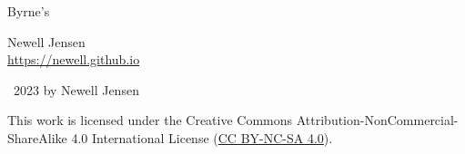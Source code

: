 \documentclass[twoside,11pt]{report}
\begin{document}
\onehalfspacing


%       



\pagecolor{background}
\thispagestyle{empty}

\hfill

\hfill

\hfill

\begin{flushright}
  \LARGE{Byrne's}\\
  \Huge{\color{cred}{E}\color{cblue}{u}\color{cyellow}{c}\color{cred}{l}\color{cblue}{i}\color{cyellow}{d}}
\end{flushright}

\vspace*{\fill}
\newpage

\thispagestyle{empty}

Newell Jensen\\
\url{https://newell.github.io}
\vspace*{\fill}

\large{\textcopyright\ 2023 by Newell Jensen}

\hfill

\hfill

\centerline{\ccbyncsa}

\begin{center}
  \large{This work is licensed under the Creative Commons Attribution-NonCommercial-ShareAlike 4.0 International License (\href{https://creativecommons.org/licenses/by-nc-sa/4.0/}{CC BY-NC-SA 4.0}).}
\end{center}
\vspace*{\fill}
\newpage
\end{document}
